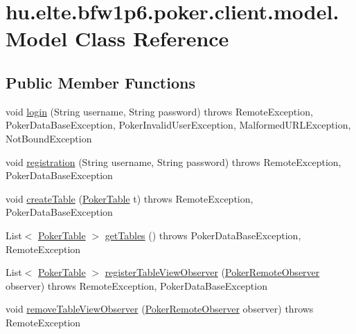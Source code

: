 \hypertarget{classhu_1_1elte_1_1bfw1p6_1_1poker_1_1client_1_1model_1_1_model}{}\section{hu.\+elte.\+bfw1p6.\+poker.\+client.\+model.\+Model Class Reference}
\label{classhu_1_1elte_1_1bfw1p6_1_1poker_1_1client_1_1model_1_1_model}
\subsection*{Public Member Functions}
\begin{DoxyCompactItemize}
\item 
void \hyperlink{classhu_1_1elte_1_1bfw1p6_1_1poker_1_1client_1_1model_1_1_model_a3dc5865ec7c522abe8623a90ee0a408d}{login} (String username, String password)  throws Remote\+Exception, Poker\+Data\+Base\+Exception, Poker\+Invalid\+User\+Exception, Malformed\+U\+R\+L\+Exception, Not\+Bound\+Exception 
\item 
void \hyperlink{classhu_1_1elte_1_1bfw1p6_1_1poker_1_1client_1_1model_1_1_model_ad959ae6a3f4bb7c6092cecfa62b93254}{registration} (String username, String password)  throws Remote\+Exception, Poker\+Data\+Base\+Exception 
\item 
void \hyperlink{classhu_1_1elte_1_1bfw1p6_1_1poker_1_1client_1_1model_1_1_model_a74e90af5d10094b769eb4d0b5c0b750c}{create\+Table} (\hyperlink{classhu_1_1elte_1_1bfw1p6_1_1poker_1_1model_1_1entity_1_1_poker_table}{Poker\+Table} t)  throws Remote\+Exception, Poker\+Data\+Base\+Exception 
\item 
List$<$ \hyperlink{classhu_1_1elte_1_1bfw1p6_1_1poker_1_1model_1_1entity_1_1_poker_table}{Poker\+Table} $>$ \hyperlink{classhu_1_1elte_1_1bfw1p6_1_1poker_1_1client_1_1model_1_1_model_a677534d3d81395feadb2cf276a0f9ab4}{get\+Tables} ()  throws Poker\+Data\+Base\+Exception, Remote\+Exception 
\item 
List$<$ \hyperlink{classhu_1_1elte_1_1bfw1p6_1_1poker_1_1model_1_1entity_1_1_poker_table}{Poker\+Table} $>$ \hyperlink{classhu_1_1elte_1_1bfw1p6_1_1poker_1_1client_1_1model_1_1_model_a1c0a4c2427e5c246e850ef815ed35a8c}{register\+Table\+View\+Observer} (\hyperlink{interfacehu_1_1elte_1_1bfw1p6_1_1poker_1_1client_1_1observer_1_1_poker_remote_observer}{Poker\+Remote\+Observer} observer)  throws Remote\+Exception, Poker\+Data\+Base\+Exception 
\item 
void \hyperlink{classhu_1_1elte_1_1bfw1p6_1_1poker_1_1client_1_1model_1_1_model_a741b5da979dbd75d566ffbbcbbb2df3c}{remove\+Table\+View\+Observer} (\hyperlink{interfacehu_1_1elte_1_1bfw1p6_1_1poker_1_1client_1_1observer_1_1_poker_remote_observer}{Poker\+Remote\+Observer} observer)  throws Remote\+Exception 

\end{DoxyCompactItemize}
